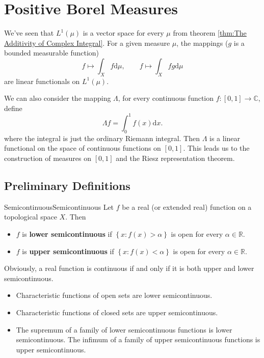 \documentclass[../main.tex]{subfiles}
\begin{document}
\chapter{Positive Borel Measures}

We've seen that $L^1(\mu)$ is a vector space for every $\mu$ from theorem \ref{thm:The Additivity of Complex Integral}. For a given measure $\mu$, the mappings ($g$ is a bounded measurable function)
\begin{equation*}
	f \mapsto \int_X f \mathrm{d} \mu, \qquad f \mapsto \int_X fg \mathrm{d} \mu
\end{equation*}
are linear functionals on $L^1(\mu)$.

We can also consider the mapping $\Lambda$, for every continuous function $f: [0,1] \rightarrow \mathbb{C}$, define
\begin{equation*}
	\Lambda f = \int_0^1 f(x) \mathrm{d} x.
\end{equation*}
where the integral is just the ordinary Riemann integral. Then $\Lambda$ is a linear functional on the space of continuous functions on $[0,1]$. This leads us to the construction of measures on $[0,1]$ and the Riesz representation theorem.

\section{Preliminary Definitions}
\begin{definition}{Semicontinuous}{Semicontinuous}
Let $f$ be a real (or extended real) function on a topological space $X$. Then
\begin{itemize}
	\item $f$ is \textbf{lower semicontinuous} if $\left\{ x:f(x) > \alpha \right\}$ is open for every $\alpha \in \mathbb{R}$.
	\item $f$ is \textbf{upper semicontinuous} if $\left\{ x:f(x) < \alpha \right\}$ is open for every $\alpha \in \mathbb{R}$.
\end{itemize}
\end{definition}
Obviously, a real function is continuous if and only if it is both upper and lower semicontinuous.

\begin{itemize}
\item Characteristic functions of open sets are lower semicontinuous.
\item Characteristic functions of closed sets are upper semicontinuous.
\item The supremum of a family of lower semicontinuous functions is lower semicontinuous. The infimum of a family of upper semicontinuous functions is upper semicontinuous.
\end{itemize}
\end{document}

